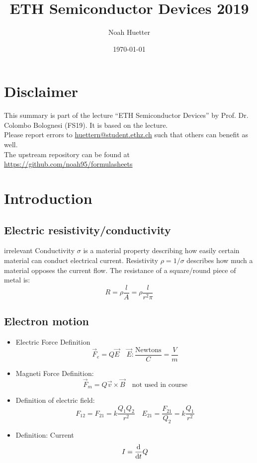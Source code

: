 \documentclass[a4paper, fontsize=8pt, landscape, DIV=1]{scrartcl}
\title{ETH Semiconductor Devices 2019}
\author{Noah Huetter}
\date{\today}
\newcommand{\makeultracompact}{irrelevant}
\begin{document}
\setcounter{page}{0}
\setcounter{secnumdepth}{2} %
\begin{multicols*}{4}
	\section*{Disclaimer}
	This summary is part of the lecture ``ETH Semiconductor Devices'' by Prof. Dr. Colombo Bolognesi (FS19). It is based on the lecture. \\[6pt]
	Please report errors to \href{mailto:huettern@student.ethz.ch}{huettern@student.ethz.ch} such that others can benefit as well.\\[6pt]	
  The upstream repository can be found at \href{https://github.com/noah95/formulasheets}{https://github.com/noah95/formulasheets}
	\vfill\null
	\pagebreak
  \maketitle 
  \setcounter{page}{1}
  \thispagestyle{fancy}

  \section{Introduction}
    \subsection{Electric resistivity/conductivity}
    \ifdefined\makeultracompact\else
      Conductivity $\sigma$ is a material property describing how easily certain material can conduct electrical current.
      Resistivity $\rho = 1/\sigma$ describes how much a material opposes the current flow.
      The resistance of a square/round piece of metal is:
    \fi
    \[R=\rho\frac{l}{A}=\rho\frac{l}{r^2\pi}\]

    \subsection{Electron motion}
    \begin{itemize}
      \item Electric Force Definition
        \[\vec{F}_e = Q\vec{E} \quad \vec{E}:\frac{\text{Newtons}}{C}=\frac{V}{m}\]
      \item Magneti Force Definition:
        \[\vec{F}_m = Q\vec{v}\times\vec{B} \quad \text{not used in course}\]
      \item Definition of electric field:
        \[F_{12}=F_{21}=k\frac{Q_1Q_2}{r^2} \quad E_{21}=\frac{F_21}{Q_2}=k\frac{Q_1}{r^2}\]
      \item Definition: Current
        \[I = \frac{\mathrm{d}}{\mathrm{d}t}Q\]
    \end{itemize}


\end{multicols*}
\end{document}

